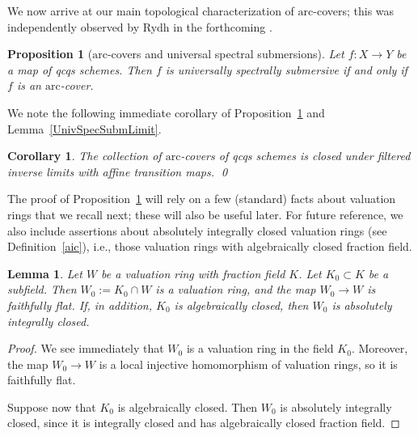 \documentclass[reqno]{amsart}
\newcommand{\arc}{\mathrm{arc}}
\newtheorem{proposition}[theorem]{Proposition}
\newtheorem{lemma}[theorem]{Lemma}
\newtheorem{corollary}[theorem]{Corollary}
\theoremstyle{definition}
\begin{document}
We now arrive at our main topological characterization of $\arc$-covers; this was independently observed by Rydh in the forthcoming \cite{RydhII}.


\begin{proposition}[$\arc$-covers and universal spectral submersions]
\label{UnivSubArc}
Let $f\colon X \to Y$ be a map of qcqs schemes. Then $f$ is universally spectrally submersive if and only if $f$ is an $\arc$-cover.
\end{proposition}


We note the following immediate corollary of Proposition~\ref{UnivSubArc} and
Lemma~\ref{UnivSpecSubmLimit}. 
\begin{corollary} 
The collection of $\arc$-covers
of qcqs schemes
is closed
under filtered inverse limits with affine transition maps.  \qed 
\end{corollary} 


 The proof of Proposition~\ref{UnivSubArc} will rely on a few (standard) facts about valuation rings that we recall next; these will also be useful later. 
For future reference, we also include assertions about absolutely integrally
closed valuation rings (see Definition~\ref{aic}), i.e., those valuation
rings with algebraically closed fraction field. 



\begin{lemma} 
Let $W$ be a valuation ring with fraction field $K$. Let $K_0 \subset K$ be a
subfield. Then $W_0 := K_0 \cap W$ is a valuation ring, and
the map $W_0 \to W$ is faithfully flat. 
If, in addition, $K_0$ is algebraically closed, then $W_0$ is absolutely integrally closed. 
\label{aicflatlemma}
\end{lemma} 
\begin{proof} 
We see immediately that $W_0$ is a valuation ring in the field $K_0$. 
Moreover, the map $W_0 \to W$ is a local injective homomorphism 
of valuation rings, so it is faithfully flat. 

Suppose now that $K_0$ is algebraically closed. 
Then $W_0$ is absolutely integrally closed, since it is integrally closed and has algebraically closed
fraction field.  
\end{proof} 
\end{document}
